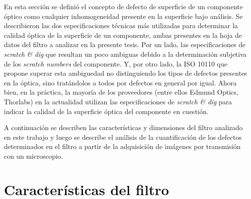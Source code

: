 En esta sección se definió el concepto de defecto de superficie de un componente óptico como cualquier inhomogeneidad presente en la superficie bajo análisis. Se describieron las dos especificaciones técnicas más utilizadas para determinar la calidad óptica de la superficie de un componente, ambas presentes en la hoja de datos del filtro a analizar en la presente tesis. Por un lado, las especificaciones de \textit{scratch \& dig} que resultan un poco ambiguas debido a la determinación subjetiva de los \textit{scratch numbers} del componente. Y, por otro lado, la ISO 10110 que propone superar esta ambiguedad no distinguiendo los tipos de defectos presentes en la óptica, sino tratándolos a todos por defectos en general por igual. Ahora bien, en la práctica, la mayoría de los proveedores (entre ellos Edmund Optics, Thorlabs) en la actualidad utilizan las especificaciones de \textit{scratch \& dig} para indicar la calidad de la superficie óptica del componente en cuestión. 
 
 A continuación se describen las características y dimensiones del filtro analizado en este trabajo y luego se describe el análisis de la cuantificación de los defectos determinados en el filtro a partir de la adquisición de imágenes por transmisión con un microscopio.

\singlespacing
\section{Características del filtro}

